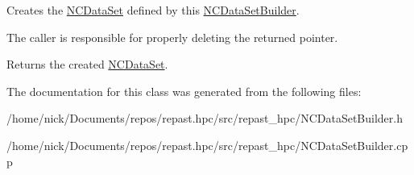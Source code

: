 Creates the \hyperlink{classrepast_1_1_n_c_data_set}{N\-C\-Data\-Set} defined by this \hyperlink{classrepast_1_1_n_c_data_set_builder}{N\-C\-Data\-Set\-Builder}. 

The caller is responsible for properly deleting the returned pointer.

\begin{DoxyReturn}{Returns}
the created \hyperlink{classrepast_1_1_n_c_data_set}{N\-C\-Data\-Set}. 
\end{DoxyReturn}


The documentation for this class was generated from the following files\-:\begin{DoxyCompactItemize}
\item 
/home/nick/\-Documents/repos/repast.\-hpc/src/repast\-\_\-hpc/N\-C\-Data\-Set\-Builder.\-h\item 
/home/nick/\-Documents/repos/repast.\-hpc/src/repast\-\_\-hpc/N\-C\-Data\-Set\-Builder.\-cpp\end{DoxyCompactItemize}
